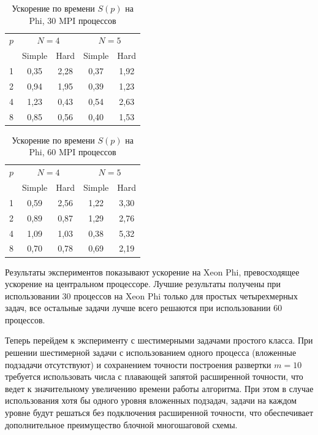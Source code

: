 \begin{table}
    \centering
    \begin{tabular}{|c|c|c|c|c|}
    \hline
    \(p\) & \multicolumn{2}{|c|}{\(N=4\)} & \multicolumn{2}{|c|}{\(N=5\)}\\ \cline{2-5}
    & Simple & Hard & Simple & Hard \\ \hline
	1 & 0,35 & 2,28 & 0,37 & 1,92 \\ \hline
	2 & 0,94 & 1,95 & 0,39 & 1,23 \\ \hline
	4 & 1,23 & 0,43 & 0,54 & 2,63 \\ \hline
	8 & 0,85 & 0,56 & 0,40 & 1,53 \\ \hline
	\end{tabular}
    \caption{Ускорение по времени \(S(p)\) на Phi, 30 MPI процессов}
    \label{table:time_speedUp_phi_30mpi_easy}
\end{table}
\begin{table}
    \centering
    \begin{tabular}{|c|c|c|c|c|}
    \hline
    \(p\) & \multicolumn{2}{|c|}{\(N=4\)} & \multicolumn{2}{|c|}{\(N=5\)}\\ \cline{2-5}
    & Simple & Hard & Simple & Hard \\ \hline
	1 & 0,59 & 2,56 & 1,22 & 3,30 \\ \hline
	2 & 0,89 & 0,87 & 1,29 & 2,76 \\ \hline
	4 & 1,09 & 1,03 & 0,38 & 5,32 \\ \hline
	8 & 0,70 & 0,78 & 0,69 & 2,19 \\ \hline
	\end{tabular}
    \caption{Ускорение по времени \(S(p)\) на Phi, 60 MPI процессов}
    \label{table:time_speedUp_phi_60mpi_easy}
\end{table}
\par
Результаты экспериментов показывают ускорение на Xeon Phi, превосходящее ускорение на центральном процессоре. Лучшие результаты получены при использовании 30 процессов на Xeon Phi только для простых четырехмерных задач, все остальные задачи лучше всего решаются при использовании 60 процессов.
\par
Теперь перейдем к эксперименту с шестимерными задачами простого класса. При решении шестимерной задачи с использованием одного процесса (вложенные подзадачи отсутствуют) и сохранением точности построения развертки \(m=10\) требуется использовать числа с плавающей запятой расширенной точности, что ведет к значительному увеличению времени работы алгоритма. При этом в случае использования хотя бы одного уровня вложенных подзадач, задачи на каждом уровне будут решаться без подключения расширенной точности, что обеспечивает дополнительное преимущество блочной многошаговой схемы.
